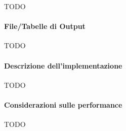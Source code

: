   TODO

  \paragraph{File/Tabelle di Output}\label{par:job1:spark:output}

  TODO

  \paragraph{Descrizione dell’implementazione}\label{par:job1:spark:implementation}

  TODO

  \paragraph{Considerazioni sulle performance}\label{par:job1:spark:performance}

  TODO

